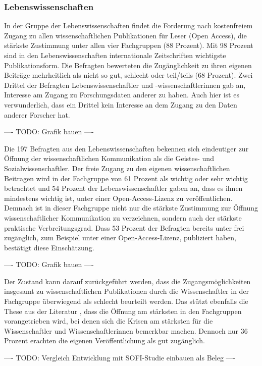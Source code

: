 \subsubsection{Lebenswissenschaften}

In der Gruppe der Lebenswissenschaften findet die Forderung nach kostenfreiem Zugang zu allen wissenschaftlichen Publikationen für Leser (Open Access), die stärkste Zustimmung unter allen vier Fachgruppen (88 Prozent). Mit 98 Prozent sind in den Lebenswissenschaften internationale Zeitschriften wichtigste Publikationsform. Die Befragten bewerteten die Zugänglichkeit zu ihren eigenen Beiträge mehrheitlich als nicht so gut, schlecht oder teil/teils (68 Prozent). Zwei Drittel der Befragten Lebenswissenschaftler und -wissenschaftlerinnen gab an, Interesse am Zugang zu Forschungsdaten anderer zu haben. Auch hier ist es verwunderlich, dass ein Drittel kein Interesse an dem Zugang zu den Daten anderer Forscher hat.

---- TODO: Grafik bauen  ----

Die 197 Befragten aus den Lebenswissenschaften bekennen sich eindeutiger zur Öffnung der wissenschaftlichen Kommunikation als die Geistes- und Sozialwissenschaftler. Der freie Zugang zu den eigenen wissenschaftlichen Beitragen wird in der Fachgruppe von 61 Prozent als wichtig oder sehr wichtig betrachtet und 54 Prozent der Lebenswissenschaftler gaben an, dass es ihnen mindestens wichtig ist, unter einer Open-Access-Lizenz zu veröffentlichen. Demnach ist in dieser Fachgruppe nicht nur die stärkste Zustimmung zur Öffnung wissenschaftlicher Kommunikation zu verzeichnen, sondern auch der stärkste praktische Verbreitungsgrad. Dass 53 Prozent der Befragten bereits unter frei zugänglich, zum Beispiel unter einer Open-Access-Lizenz, publiziert haben, bestätigt diese Einschätzung.

---- TODO: Grafik bauen  ----

Der Zustand kann darauf zurückgeführt werden, dass die Zugangsmöglichkeiten insgesamt zu wissenschaftlichen Publikationen durch die Wissenschaftler in der Fachgruppe überwiegend als schlecht beurteilt werden. Das stützt ebenfalls die These aus der Literatur \cite{suchen}, dass die Öffnung am stärksten in den Fachgruppen vorangetrieben wird, bei denen sich die Krisen am stärksten für die Wissenschaftler und Wissenschaftlerinnen bemerkbar machen. Dennoch nur 36 Prozent erachten die eigenen Veröffentlichung als gut zugänglich.

---- TODO: Vergleich Entwicklung mit SOFI-Studie einbauen als Beleg ----

